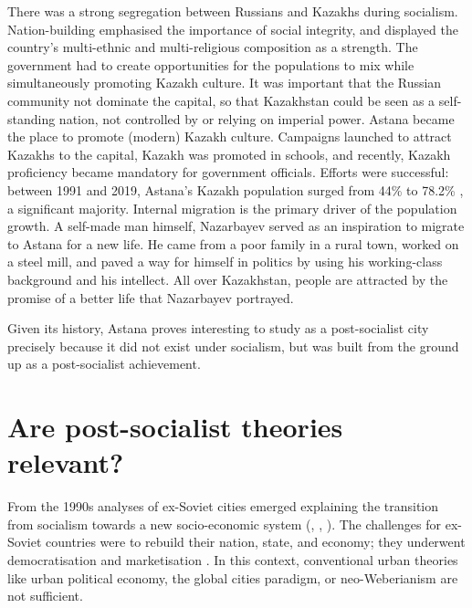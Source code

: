 \documentclass{article}
\begin{document}
There was a strong segregation between Russians and Kazakhs during socialism. Nation-building emphasised the importance of social integrity, and displayed the country's multi-ethnic and multi-religious composition as a strength. The government had to create opportunities for the populations to mix while simultaneously promoting Kazakh culture. It was important that the Russian community not dominate the capital, so that Kazakhstan could be seen as a self-standing nation, not controlled by or relying on imperial power. 
Astana became the place to promote (modern) Kazakh culture.
Campaigns launched to attract Kazakhs to the capital, Kazakh was promoted in schools, and recently, Kazakh proficiency became mandatory for government officials. Efforts were successful: between 1991 and 2019, Astana's Kazakh population surged from 44\% to 78.2\% \parencite{unfpa2020wekazakhstan}, a significant majority. 
Internal migration is the primary driver of the population growth. A self-made man himself, Nazarbayev served as an inspiration to migrate to Astana for a new life. He came from a poor family in a rural town, worked on a steel mill, and paved a way for himself in politics by using his working-class background and his intellect. All over Kazakhstan, people are attracted by the promise of a better life that Nazarbayev portrayed.

Given its history, Astana proves interesting to study as a post-socialist city precisely because it did not exist under socialism, but was built from the ground up as a post-socialist achievement.

\section{Are post-socialist theories relevant?}

From the 1990s analyses of ex-Soviet cities emerged explaining the transition from socialism towards a new socio-economic system (\cite{smith1996socialist}, \cite{sailer1999characteristics}, \cite{hirt2013whatever}). The challenges for ex-Soviet countries were to rebuild their nation, state, and economy; they underwent democratisation and marketisation \parencite{ferenvcuhova2016introduction}. 
In this context, conventional urban theories like urban political economy, the global cities paradigm, or neo-Weberianism \parencite{haussermann2005european} are not sufficient.
\end{document}
